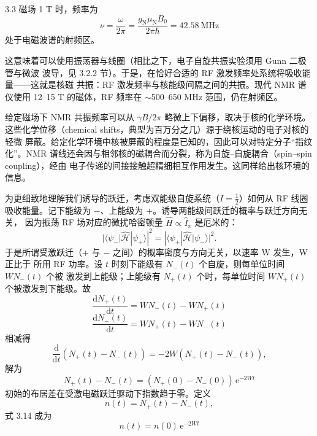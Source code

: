 \begin{example}{3.3}
磁场 1 T 时，频率为
\begin{equation*}
\nu = \frac{\omega}{2\pi} = \frac{g_{\mathrm{N}}\mu_{\mathrm{N}}B_0}{2\pi\hbar} = 42.58\ \mathrm{MHz}\tag{3.9}
\end{equation*}
处于电磁波谱的射频区。
\end{example}

这意味着可以使用振荡器与线圈（相比之下，电子自旋共振实验须用 Gunn 二极管与微波
波导，见 3.2.2 节）。于是，在恰好合适的 RF 激发频率处系统将吸收能量——这就是核磁
共振：RF 激发频率与核能级间隔之间的共振。现代 NMR 谱仪使用 12--15 T 的磁体，RF
频率在 $\sim$500--650 MHz 范围，仍在射频区。

给定磁场下 NMR 共振频率可以从 $\gamma B/2\pi$ 略微上下偏移，取决于核的化学环境。
这些化学位移（chemical shifts，典型为百万分之几）源于绕核运动的电子对核的轻微
屏蔽。给定化学环境中核被屏蔽的程度是已知的，因此可以对特定分子“指纹化”。NMR
谱线还会因与相邻核的磁耦合而分裂，称为自旋--自旋耦合（spin--spin coupling），经由
电子传递的间接接触超精细相互作用发生。这同样给出核环境的信息。

为更细致地理解我们诱导的跃迁，考虑双能级自旋系统（$I=\frac{1}{2}$）如何从 RF
线圈吸收能量。记下能级为 $-$、上能级为 $+$。诱导两能级间跃迁的概率与跃迁方向无关，
因为振荡 RF 场对应的微扰哈密顿量 $\hat{H}\propto\hat{I}_x$ 是厄米的：
\begin{equation*}
|\langle\psi_-|\hat{\mathcal{H}}|\psi_+\rangle|^{2} = |\langle\psi_+|\hat{\mathcal{H}}|\psi_-\rangle|^{2}.\tag{3.10}
\end{equation*}
于是所谓受激跃迁（+ 与 $-$ 之间）的概率密度与方向无关，以速率 W 发生，W 正比于
所用 RF 功率。设 $t$ 时刻下能级有 $N_-(t)$ 个自旋，则每单位时间 $WN_-(t)$ 个被
激发到上能级；上能级有 $N_+(t)$ 个时，每单位时间 $WN_+(t)$ 个被激发到下能级。故
\begin{equation*}
\frac{\mathrm{d}N_+(t)}{\mathrm{d}t} = WN_-(t) - WN_+(t)\tag{3.11}
\end{equation*}
\begin{equation*}
\frac{\mathrm{d}N_-(t)}{\mathrm{d}t} = WN_+(t) - WN_-(t)\tag{3.12}
\end{equation*}
相减得
\begin{equation*}
\frac{\mathrm{d}}{\mathrm{d}t}(N_+(t)-N_-(t)) = -2W(N_+(t)-N_-(t)),\tag{3.13}
\end{equation*}
解为
\begin{equation*}
N_+(t)-N_-(t) = (N_+(0)-N_-(0))\,\mathrm{e}^{-2Wt}\tag{3.14}
\end{equation*}
初始的布居差在受激电磁跃迁驱动下指数趋于零。定义
\begin{equation*}
n(t) = N_+(t)-N_-(t),\tag{3.15}
\end{equation*}
式 3.14 成为
\begin{equation*}
n(t) = n(0)\,\mathrm{e}^{-2Wt}\tag{3.16}
\end{equation*}

